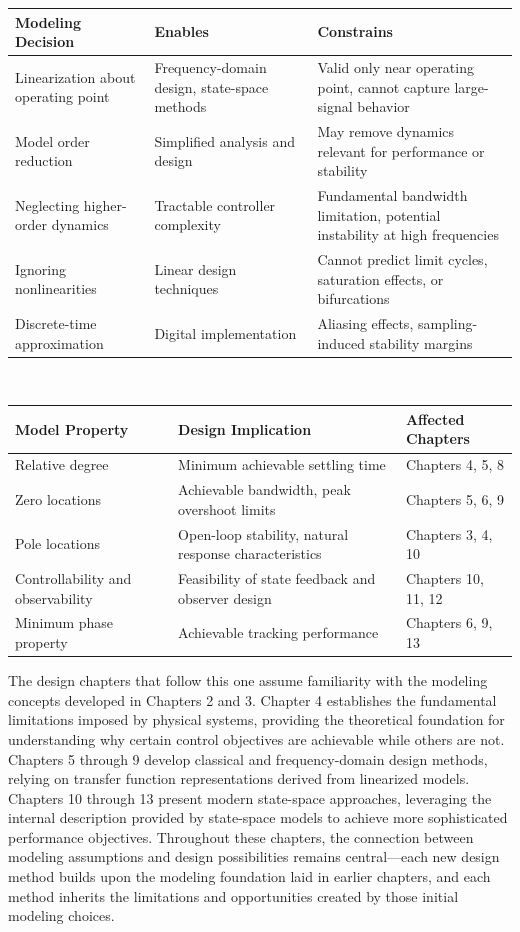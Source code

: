 \begin{table}[h!]
\centering
\begin{tabular}{|p{2.0in}|p{2.5in}|p{2.0in}|}
\hline
\textbf{Modeling Decision} & \textbf{Enables} & \textbf{Constrains} \\
\hline
Linearization about operating point & Frequency-domain design, state-space methods & Valid only near operating point, cannot capture large-signal behavior \\
\hline
Model order reduction & Simplified analysis and design & May remove dynamics relevant for performance or stability \\
\hline
Neglecting higher-order dynamics & Tractable controller complexity & Fundamental bandwidth limitation, potential instability at high frequencies \\
\hline
Ignoring nonlinearities & Linear design techniques & Cannot predict limit cycles, saturation effects, or bifurcations \\
\hline
Discrete-time approximation & Digital implementation & Aliasing effects, sampling-induced stability margins \\
\hline
\end{tabular}
\\
\vskip 0.15in
\hskip 0.5in\begin{tabular}{|p{2.0in}|p{2.5in}|p{2.0in}|}
\hline
\textbf{Model Property} & \textbf{Design Implication} & \textbf{Affected Chapters} \\
\hline
Relative degree & Minimum achievable settling time & Chapters 4, 5, 8 \\
\hline
Zero locations & Achievable bandwidth, peak overshoot limits & Chapters 5, 6, 9 \\
\hline
Pole locations & Open-loop stability, natural response characteristics & Chapters 3, 4, 10 \\
\hline
Controllability and observability & Feasibility of state feedback and observer design & Chapters 10, 11, 12 \\
\hline
Minimum phase property & Achievable tracking performance & Chapters 6, 9, 13 \\
\hline
\end{tabular}
\vskip 0.1in
\end{table}

The design chapters that follow this one assume familiarity with the modeling concepts developed in Chapters 2 and 3. Chapter 4 establishes the fundamental limitations imposed by physical systems, providing the theoretical foundation for understanding why certain control objectives are achievable while others are not. Chapters 5 through 9 develop classical and frequency-domain design methods, relying on transfer function representations derived from linearized models. Chapters 10 through 13 present modern state-space approaches, leveraging the internal description provided by state-space models to achieve more sophisticated performance objectives. Throughout these chapters, the connection between modeling assumptions and design possibilities remains central—each new design method builds upon the modeling foundation laid in earlier chapters, and each method inherits the limitations and opportunities created by those initial modeling choices.

